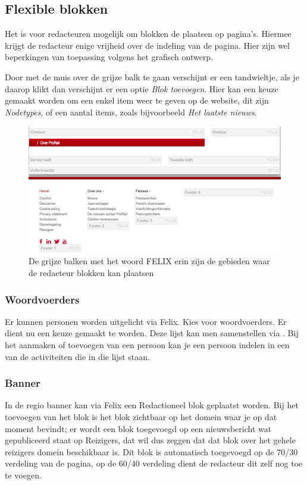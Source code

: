 
\subsection{Flexible blokken}\label{felix}
Het is voor redacteuren mogelijk om blokken de plaatsen op pagina's. Hiermee krijgt de redacteur enige vrijheid over de indeling van de pagina. Hier zijn wel beperkingen van toepassing volgens het grafisch ontwerp.

Door met de muis over de grijze balk te gaan verschijnt er een tandwieltje, als je daarop klikt dan verschijnt er een optie \emph{Blok toevoegen}. Hier kan een keuze gemaakt worden om een enkel item weer te geven op de website, dit zijn \emph{Nodetypes}, of een aantal items, zoals bijvoorbeeld \emph{Het laatste nieuws}.

\begin{figure}[p]
\centering
\includegraphics[width=\textwidth]{img/felix.png}
\caption{De grijze balken met het woord FELIX erin zijn de gebieden waar de redacteur blokken kan plaatsen}
\label{fig:felix_image}
\end{figure}

\subsubsection{Woordvoerders}
Er kunnen personen worden uitgelicht via Felix. Kies voor woordvoerders. Er dient nu een keuze gemaakt te worden. Deze lijst kan men samenstellen via . Bij het aanmaken of toevoegen van een persoon kan je een persoon indelen in een van de activiteiten die in die lijst staan.

\subsubsection{Banner}
In de regio banner kan via Felix een Redactioneel blok geplaatst worden. Bij het toevoegen van het blok is het blok zichtbaar op het domein waar je op dat moment bevindt; er wordt een blok toegevoegd op een nieuwsbericht wat gepubliceerd staat op Reizigers, dat wil dus zeggen dat dat blok over het gehele reizigers domein beschikbaar is. Dit blok is automatisch toegevoegd op de 70/30 verdeling van de pagina, op de 60/40 verdeling dient de redacteur dit zelf nog toe te voegen.


